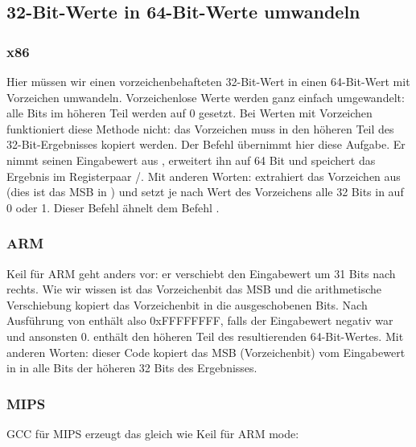 \subsection{32-Bit-Werte in 64-Bit-Werte umwandeln}
\label{subsec:sign_extending_32_to_64}



\subsubsection{x86}


Hier müssen wir einen vorzeichenbehafteten 32-Bit-Wert in einen 64-Bit-Wert mit Vorzeichen umwandeln.
Vorzeichenlose Werte werden ganz einfach umgewandelt: alle Bits im höheren Teil werden auf 0 gesetzt.
Bei Werten mit Vorzeichen funktioniert diese Methode nicht: das Vorzeichen muss in den höheren Teil des
32-Bit-Ergebnisses kopiert werden.
Der Befehl  übernimmt hier diese Aufgabe. Er nimmt seinen Eingabewert aus \EAX, erweitert ihn auf 64 Bit und
speichert das Ergebnis im Registerpaar \EDX/\EAX.
Mit anderen Worten:  extrahiert das Vorzeichen aus \EAX (dies ist das MSB in \EAX) und setzt je nach Wert des
Vorzeichens alle 32 Bits in \EDX auf 0 oder 1.
Dieser Befehl ähnelt dem Befehl \MOVSX.

\subsubsection{ARM}


Keil für ARM geht anders vor: er verschiebt den Eingabewert um 31 Bits nach rechts.
Wie wir wissen ist das Vorzeichenbit das \ac{MSB} und die arithmetische Verschiebung kopiert das Vorzeichenbit in die
ausgeschobenen Bits. Nach Ausführung von  enthält  also 0xFFFFFFFF, falls der Eingabewert
negativ war und ansonsten 0.
 enthält den höheren Teil des resultierenden 64-Bit-Wertes.
Mit anderen Worten: dieser Code kopiert das \ac{MSB} (Vorzeichenbit) vom Eingabewert in  in alle Bits der höheren
32 Bits des Ergebnisses.

\subsubsection{MIPS}
GCC für MIPS erzeugt das gleich wie Keil für ARM mode:


